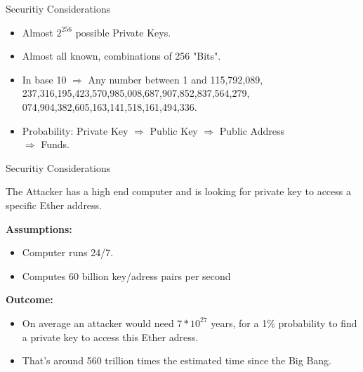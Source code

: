 \documentclass[handout]{beamer}
\begin{document}
\begin{frame}{Securitiy Considerations}

\begin{itemize}
		\item<1-> Almost $2^{256}$ possible Private Keys.
		\item<2-> Almost all known, combinations of 256 "Bits".
		\item<3-> In base 10 $\Rightarrow$ Any number between 1 and 115,792,089,\\
		237,316,195,423,570,985,008,687,907,852,837,564,279, \\
		074,904,382,605,163,141,518,161,494,336.
		\item<4-> Probability: Private Key $\Rightarrow$ Public Key $\Rightarrow$ Public Address \\ $\Rightarrow$ Funds. 
	\end{itemize}

\end{frame}

\begin{frame}{Securitiy Considerations}

The Attacker has a high end computer and is looking for private key to access a specific Ether address.

\vspace{1em}

\textbf{Assumptions:}
\begin{itemize}
\item<1-> Computer runs 24/7.
\item<2-> Computes 60 billion key/adress pairs per second
\end{itemize}

\vspace{1em}

\textbf{Outcome:}
\begin{itemize}
\item<1-> On average an attacker would need $7*10^{27}$ years, for a 1\% probability to find a private key to access this Ether adress. 
\item<2-> That's around 560 trillion times the estimated time since the Big Bang.
\end{itemize}

\end{frame}
\end{document}
